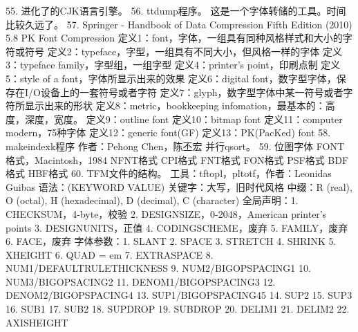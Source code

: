 %
%
%
%
55. 进化了的CJK语言引擎。
56. ttdump程序。
    这是一个字体转储的工具。时间比较久远了。
57. Springer - Handbook of Data Compression Fifth Edition (2010)
    5.8 PK Font Compression
    定义1：font，字体，一组具有同种风格样式和大小的字符或符号
    定义2：typeface，字型，一组具有不同大小，但风格一样的字体
    定义3：typeface family，字型组，一组字型
    定义4：printer's point，印刷点制
    定义5：style of a font，字体所显示出来的效果
    定义6：digital font，数字型字体，保存在I/O设备上的一套符号或者字符
    定义7：glyph，数字型字体中某一符号或者字符所显示出来的形状
    定义8：metric，bookkeeping infomation，最基本的：高度，深度，宽度。
    定义9：outline font
    定义10：bitmap font
    定义11：computer modern，75种字体
    定义12：generic font(GF)
    定义13：PK(PacKed) font
58. makeindexk程序
    作者：Pehong Chen，陈丕宏
    并行qsort。
59. 位图字体
    FONT格式，Macintosh，1984
    NFNT格式
    CPI格式
    FNT格式
    FON格式
    PSF格式
    BDF格式
    HBF格式
60. TFM文件的结构。
    工具：tftopl，pltotf，作者：Leonidas Guibas
    语法：(KEYWORD VALUE)
    关键字：大写，旧时代风格
    中缀：R (real), O (octal), H (hexadecimal), D (decimal), C (character)
    全局声明：1. CHECKSUM，4-byte，校验
              2. DESIGNSIZE，0-2048，American printer's points
              3. DESIGNUNITS，正值
              4. CODINGSCHEME，废弃
              5. FAMILY，废弃
              6. FACE，废弃
    字体参数：1. SLANT
              2. SPACE
              3. STRETCH
              4. SHRINK
              5. XHEIGHT
              6. QUAD = em
              7. EXTRASPACE
              8. NUM1/DEFAULTRULETHICKNESS
              9. NUM2/BIGOPSPACING1
              10. NUM3/BIGOPSACING2
              11. DENOM1/BIGOPSPACING3
              12. DENOM2/BIGOPSPACING4
              13. SUP1/BIGOPSPACING45
              14. SUP2
              15. SUP3
              16. SUB1
              17. SUB2
              18. SUPDROP
              19. SUBDROP
              20. DELIM1
              21. DELIM2
              22. AXISHEIGHT
